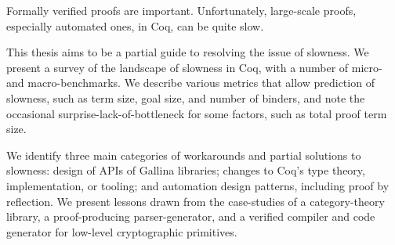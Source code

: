 %
%
%
%
%
%
Formally verified proofs are important.
Unfortunately, large-scale proofs, especially automated ones, in Coq, can be quite slow.

This thesis aims to be a partial guide to resolving the issue of slowness.
We present a survey of the landscape of slowness in Coq, with a number of micro- and macro-benchmarks.
We describe various metrics that allow prediction of slowness, such as term size, goal size, and number of binders, and note the occasional surprise-lack-of-bottleneck for some factors, such as total proof term size.

We identify three main categories of workarounds and partial solutions to slowness: design of APIs of Gallina libraries; changes to Coq's type theory, implementation, or tooling; and automation design patterns, including proof by reflection.
We present lessons drawn from the case-studies of a category-theory library, a proof-producing parser-generator, and a verified compiler and code generator for low-level cryptographic primitives.

